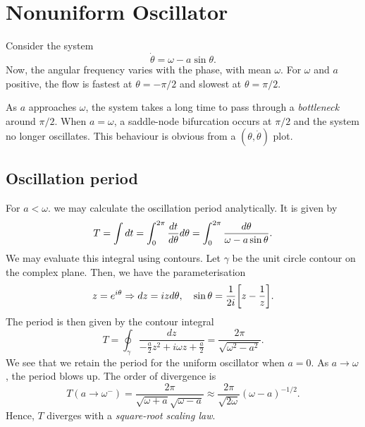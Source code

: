 \documentclass[oneside]{book}
\begin{document}
\section{Nonuniform Oscillator}
Consider the system
\begin{equation} \label{eq:421}
	\dot{\theta} = \omega - a \sin \theta.
\end{equation}
Now, the angular frequency varies with the phase, with mean $ \omega $. For $ \omega $ and $ a $ positive, the flow is fastest at $ \theta = - \pi / 2$ and slowest at $ \theta = \pi / 2 $.
\par
As $ a $ approaches $ \omega $, the system takes a long time to pass through a \textit{bottleneck} around $ \pi / 2 $. When $ a = \omega $, a saddle-node bifurcation occurs at $ \pi / 2 $ and the system no longer oscillates. This behaviour is obvious from a $ (\theta, \dot{\theta}) $ plot.
\subsection{Oscillation period}
For $ a < \omega $. we may calculate the oscillation period analytically. It is given by
\[
T = \int dt = \int_{0}^{2\pi} \dv{t}{\theta} d\theta = \int_0^{2\pi} \frac{d\theta}{\omega - a \sin \theta}.
\]
We may evaluate this integral using contours. Let $ \gamma $ be the unit circle contour on the complex plane. Then, we have the parameterisation
\[
z = e^{i\theta} \Rightarrow dz = i z d\theta, \quad \sin \theta = \frac{1}{2i} \qty[z - \frac{1}{z}].
\]
The period is then given by the contour integral
\[
T = \oint_\gamma \frac{dz}{-\tfrac{a}{2}z^2 + i \omega z + \tfrac{a}{2}} = \frac{2 \pi}{\sqrt{\omega ^ 2 - a ^ 2}}.
\]
We see that we retain the period for the uniform oscillator when $ a = 0 $. As $ a \to \omega $, the period blows up. The order of divergence is
\[
T(a \to \omega^{-}) = \frac{2\pi}{\sqrt{\omega + a} \sqrt{\omega - a}} \approx \frac{2\pi}{\sqrt{2\omega}} (\omega - a)^{-1/2}.
\]
Hence, $ T $ diverges with a \textit{square-root scaling law}.
\end{document}
